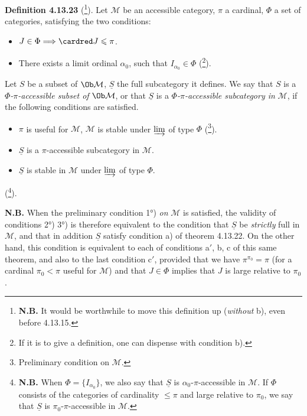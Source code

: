 \textbf{Definition 4.13.23} (\footnote{\textbf{N.B.} It would be worthwhile to move this definition up (\textit{without} b), even before 4.13.15.}). Let $\mathcal{M}$ be an accessible category, $\pi$ a cardinal, $\Phi$ a set of categories, satisfying the two conditions:
\begin{itemize}[leftmargin=2.5em]
\item[a)] $J\in\Phi\Longrightarrow\cardred J\leqslant\pi$.
\item[b)] There exists a limit ordinal $\alpha_0$, such that $I_{\alpha_0}\in\Phi$ (\footnote{If it is to give a definition, one can dispense with condition b).}).
\end{itemize}
Let $S$ be a subset of $\Ob\mathcal{M}$, $\underline{S}$ the full subcategory it defines. We say that $S$ is a \textit{$\Phi$-$\pi$-accessible subset of} $\Ob\mathcal{M}$, or that $\underline{S}$ is a \textit{$\Phi$-$\pi$-accessible subcategory in} $\mathcal{M}$, if the following conditions are satisfied.
\begin{itemize}[leftmargin=2.5em]
\item[1°)] $\pi$ is useful for $\mathcal{M}$, $\mathcal{M}$ is stable under $\varinjlim$ of type $\Phi$ (\footnote{Preliminary condition on $\mathcal{M}$.}).
\item[2°)] $\underline{S}$ is a $\pi$-accessible subcategory in $\mathcal{M}$.
\item[3°)] $\underline{S}$ is stable in $\mathcal{M}$ under $\varinjlim$ of type $\Phi$.
\end{itemize}
(\footnote{\textbf{N.B.} When $\Phi=\{I_{\alpha_0}\}$, we also say that $\underline{S}$ is $\alpha_0$-$\pi$-accessible in $\mathcal{M}$. If $\Phi$ consists of the categories of cardinality $\leqslant\pi$ and large relative to $\pi_0$, we say that $\underline{S}$ is $\pi_0$-$\pi$-accessible in $\mathcal{M}$.}).

\textbf{N.B.} When the preliminary condition 1°) \textit{on} $\mathcal{M}$ is satisfied, the validity of conditions 2°) 3°) is therefore equivalent to the condition that $\underline{S}$ be \textit{strictly} full in $\mathcal{M}$, and that in
addition $\underline{S}$ satisfy condition a) of theorem 4.13.22. On the other hand, this condition is equivalent to each of conditions a$'$, b, c of this same theorem, and also to the last condition c$'$, provided that we have $\pi^{\pi_0}=\pi$ (for a cardinal $\pi_0<\pi$ useful for $\mathcal{M}$) and that $J\in\Phi$ implies that $J$ is large relative to $\pi_0$.

